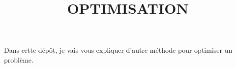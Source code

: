 
\usepackage[T1]{fontenc}
\usepackage[utf8]{inputenc}
\usepackage[margin=2cm]{geometry}
\usepackage{lmdern}
\usepackage{babel}

\renewcommand{\familydefault}{\sfdefault}

\title{OPTIMISATION}

Dans cette dépôt, je vais vous expliquer d'autre méthode pour optimiser un problème.


